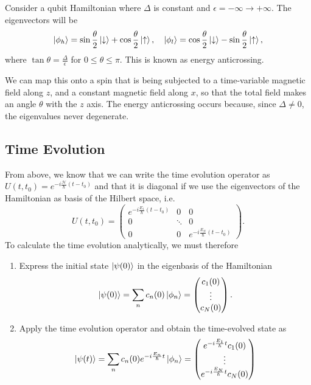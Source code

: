 \documentclass{article}
\begin{document}
Consider a qubit Hamiltonian where $\Delta $ is constant and $\epsilon =-\infty \to+\infty$. The eigenvectors will be
\[
    \ket{\phi _h}=\sin \frac{\theta }{2}\ket{\downarrow}+\cos \frac{\theta }{2}\ket{\uparrow},\quad \ket{\phi _l}=\cos \frac{\theta }{2}\ket{\downarrow}-\sin \frac{\theta }{2}\ket{\uparrow},
\]
where $\tan\theta =\frac{\Delta }{\epsilon }$ for $0\leq \theta \leq\pi $. This is known as energy anticrossing.

We can map this onto a spin that is being subjected to a time-variable magnetic field along $z$, and a constant magnetic field along $x$, so that the total field makes an angle $\theta $ with the $z$ axis. The energy anticrossing occurs because, since $\Delta \neq 0$, the eigenvalues never degenerate.

\subsection{Time Evolution}
From above, we know that we can write the time evolution operator as $U(t,t_0)=e^{-i \frac{\mathcal{H}}{\hbar}(t-t_0)}$ and that it is diagonal if we use the eigenvectors of the Hamiltonian as basis of the Hilbert space, i.e.
\[
    U(t,t_0)=\begin{pmatrix}
        e^{-i \frac{E_1}{\hbar}(t-t_0)} & 0 & 0 \\
        0 & \ddots & 0 \\
        0 & 0 & e^{-i \frac{E_N}{\hbar}(t-t_0)}
    \end{pmatrix}.
\]
To calculate the time evolution analytically, we must therefore
\begin{enumerate}
    \item Express the initial state $\ket{\psi (0)}$ in the eigenbasis of the Hamiltonian
    \[
        \ket{\psi (0)}=\sum_{n}c_n(0)\ket{\phi _n} =\begin{pmatrix}
            c_1(0) \\
            \vdots \\
            c_N(0)
        \end{pmatrix}.
    \]
\item Apply the time evolution operator and obtain the time-evolved state as
\[
    \ket{\psi (t)}=\sum_{n}c_n(0)e^{-i \frac{E_n}{\hbar}t}\ket{\phi _n}=\begin{pmatrix}
        e^{-i \frac{E_1}{\hbar}t}c_1(0) \\
        \vdots \\
        e^{-i \frac{E_N}{\hbar}t}c_N(0)
    \end{pmatrix}
\]
\end{enumerate}
\end{document}
